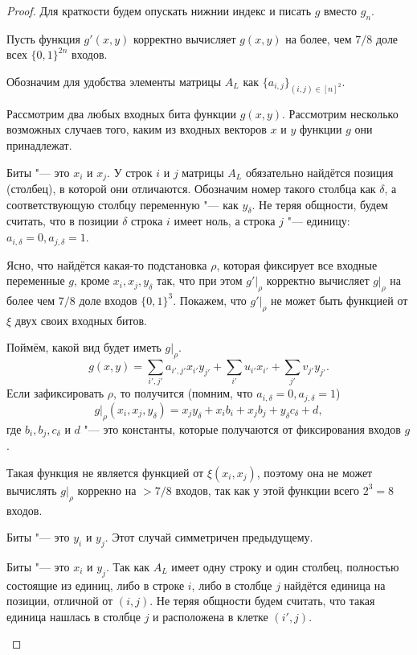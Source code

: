 \documentclass[a4paper, 14pt]{extarticle}
\begin{document}
\begin{proof}
Для краткости будем опускать нижнии индекс и писать $g$ вместо $g_n$.

Пусть функция $g'(x, y)$ корректно вычисляет $g(x, y)$ на более, чем $7/8$ доле
всех $\{0, 1\}^{2n}$ входов.

Обозначим для удобства элементы матрицы $A_L$ как $\{a_{i, j}\}_{(i, j) \in {[n]^2}}$.

Рассмотрим два любых входных бита функции $g(x, y)$. Рассмотрим несколько
возможных случаев того, каким из входных векторов $x$ и $y$ функции $g$ они
принадлежат.
\begin{description}
\item{Биты "--- это $x_i$ и $x_j$.} У строк $i$ и $j$ матрицы $A_L$ обязательно
найдётся позиция (столбец), в которой они отличаются. Обозначим номер такого
столбца как $\delta$, а соответствующую столбцу переменную "--- как $y_\delta$.
Не теряя общности, будем считать, что в позиции $\delta$ строка $i$ имеет ноль,
а строка $j$ "--- единицу: $a_{i, \delta} = 0, a_{j, \delta} = 1$.

Ясно, что найдётся какая-то подстановка $\rho$, которая фиксирует все входные
переменные $g$, кроме $x_i, x_j, y_\delta$ так, что при этом $g' \rvert _ \rho$
корректно вычисляет $g \rvert _ \rho$ на более чем $7/8$ доле входов $\{0,
1\}^3$. Покажем, что $g' \rvert _ \rho$ не может быть функцией от $\xi$ двух своих
входных битов.

Поймём, какой вид будет иметь $g \rvert _ \rho$. 
\[
g(x, y) = \sum_{i', j'} a_{i', j'} x_{i'} y_{j'} + \sum_{i'} u_{i'} x_{i'} + \sum_{j'} v_{j'} y_{j'}.
\]
Если зафиксировать $\rho$, то получится (помним, что $a_{i, \delta} = 0, a_{j, \delta} = 1$)
\[
g \rvert _ \rho (x_i, x_j, y_\delta) = x_j y_\delta + x_i b_i + x_j b_j + y_\delta c_\delta + d,
\]
где $b_i, b_j, c_\delta$ и $d$ "--- это константы, которые получаются от
фиксирования входов $g$.

Такая функция не является функцией от $\xi(x_i, x_j)$, поэтому она не может
вычислять $g \rvert _ \rho$ коррекно на $> 7/8$ входов, так как у этой функции
всего $2^3 = 8$ входов.


\item{Биты "--- это $y_i$ и $y_j$.} Этот случай симметричен предыдущему.
\item{Биты "--- это $x_i$ и $y_j$.} Так как $A_L$ имеет одну строку и один
столбец, полностью состоящие из единиц, либо в строке $i$, либо в столбце $j$
найдётся единица на позиции, отличной от $(i, j)$. Не теряя общности будем
считать, что такая единица нашлась в столбце $j$ и расположена в клетке $(i',
j)$.


\end{description}
\end{proof}
\end{document}
